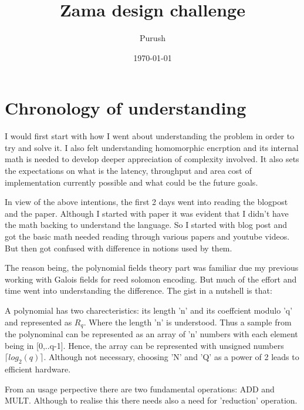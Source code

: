 \documentclass{article}
\title{Zama design challenge}
\author{Purush}
\date{\today}
\begin{document}
    \maketitle 
    
    \section{ Chronology of understanding} %

    I would first start with how I went about understanding the problem in order to try and solve it. I also felt understanding 
    homomorphic encrption and its internal math is needed to develop deeper appreciation of complexity involved. It also 
    sets the expectations on what is the latency, throughput and area cost of implementation currently possible and what could be 
    the future goals. 

    In view of the above intentions, the first 2 days went into reading the blogpost and the paper. 
    Although I started with paper it was evident that I didn't have the math backing to understand the language. 
    So I started with blog post and got the basic math needed reading through various papers and youtube videos.
    But then got confused with difference in notions used by them. 
    
    The reason being, the polynomial fields theory part was familiar due my previous working with Galois fields
    for reed solomon encoding. But much of the effort and time went into understanding the difference.
    The gist in a nutshell is that:

    \itemize 
    \item A polynomial has two charecteristics: its length 'n' and its coeffcient modulo 'q' and represented as  $R_{q}$. 
          Where the length 'n' is understood. Thus a sample from the polynominal can be represented as an array of
          'n' numbers with each element being in [0,..q-1]. Hence, the array can be represented with unsigned 
          numbers $\lceil log_2(q)\rceil$. Although not necessary, choosing 'N' and 'Q' as a power of 2 leads to 
          efficient hardware.
    \item 
    \item From an usage perpective there are two fundamental operations: ADD and MULT. Although to realise this there needs also 
          a need for 'reduction' operation. 
    \enditemize
\end{document}
